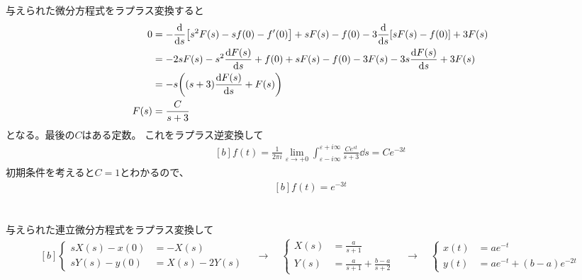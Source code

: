 \documentclass[../ap_2017.tex]{subfiles}
\begin{document}
\section{}
与えられた微分方程式をラプラス変換すると
\begin{equation}\begin{aligned}[b]
    0 &= -\dv{s}\qty[s^2F(s)-sf(0)-f'(0)]+sF(s)-f(0)-3\dv{s}\qty[sF(s)-f(0)]+3F(s) \\
    &= -2sF(s)-s^2\dv{F(s)}{s}+f(0)+sF(s)-f(0)-3F(s)-3s\dv{F(s)}{s}+3F(s)\\
    &= -s\qty((s+3)\dv{F(s)}{s}+F(s))\\
    F(s) &= \frac{C}{s+3}
\end{aligned}\end{equation}
となる。最後の\(C\)はある定数。
これをラプラス逆変換して
\begin{equation}\begin{aligned}[b]
    f(t) = \frac{1}{2\pi i}\lim_{\varepsilon\to +0}\int_{\varepsilon-i\infty}^{\varepsilon+i\infty}\frac{Ce^{st}}{s+3}\dd{s}
    = Ce^{-3t}
\end{aligned}\end{equation}
初期条件を考えると\(C=1\)とわかるので、
\begin{equation}\begin{aligned}[b]
    f(t) = e^{-3t}
\end{aligned}\end{equation}

\section{}
\subsection{}
与えられた連立微分方程式をラプラス変換して
\begin{equation}\begin{aligned}[b]
    \begin{cases}
        sX(s)-x(0) &= -X(s)\\
        sY(s)-y(0) &= X(s) - 2Y(s)
    \end{cases}
    \quad \rightarrow\quad
    \begin{cases}
        X(s) &= \frac{a}{s+1}\\
        Y(s) &= \frac{a}{s+1}+\frac{b-a}{s+2}
    \end{cases}
    \quad \rightarrow\quad
    \begin{cases}
        x(t) &= ae^{-t}\\
        y(t) &= ae^{-t}+(b-a)e^{-2t}
    \end{cases}
\end{aligned}\end{equation}
\end{document}
